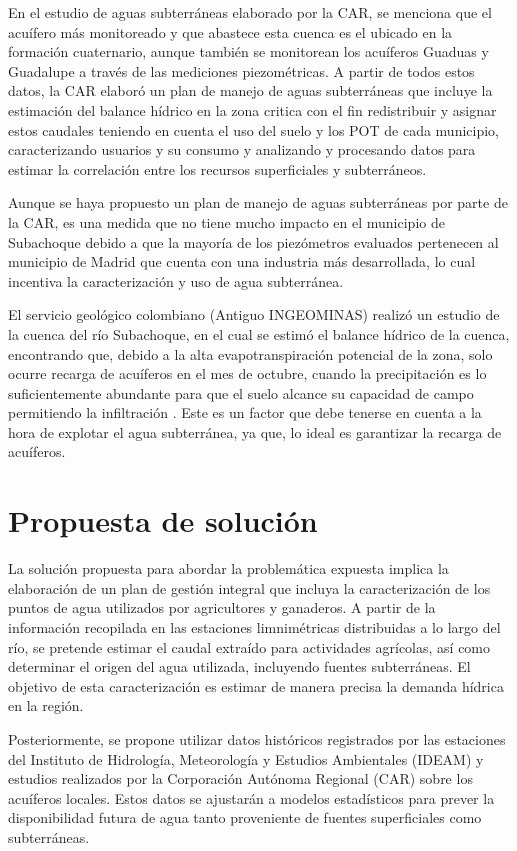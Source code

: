 \documentclass[draft]{agujournal2019}
\begin{document}
En el estudio de aguas subterráneas elaborado por la CAR, se menciona que el acuífero más monitoreado y que abastece esta cuenca es el ubicado en la formación cuaternario, aunque también se monitorean los acuíferos Guaduas y Guadalupe a través de las mediciones piezométricas. A partir de todos estos datos, la CAR elaboró un plan de manejo de aguas subterráneas que incluye la estimación del balance hídrico en la zona critica con el fin redistribuir y asignar estos caudales teniendo en cuenta el uso del suelo y los POT de cada municipio, caracterizando usuarios y su consumo y analizando y procesando datos para estimar la correlación entre los recursos superficiales y subterráneos.

Aunque se haya propuesto un plan de manejo de aguas subterráneas por parte de la CAR, es una medida que no tiene mucho impacto en el municipio de Subachoque debido a que la mayoría de los piezómetros evaluados pertenecen al municipio de Madrid que cuenta con una industria más desarrollada, lo cual incentiva la caracterización y uso de agua subterránea.

El servicio geológico colombiano (Antiguo INGEOMINAS) realizó un estudio de la cuenca del río Subachoque, en el cual se estimó el balance hídrico de la cuenca, encontrando que, debido a la alta evapotranspiración potencial de la zona, solo ocurre recarga de acuíferos en el mes de octubre, cuando la precipitación es lo suficientemente abundante para que el suelo alcance su capacidad de campo permitiendo la infiltración \cite{INGEOMINAS}. Este es un factor que debe tenerse en cuenta a la hora de explotar el agua subterránea, ya que, lo ideal es garantizar la recarga de acuíferos.

\section{Propuesta de solución}
La solución propuesta para abordar la problemática expuesta implica la elaboración de un plan de gestión integral que incluya la caracterización de los puntos de agua utilizados por agricultores y ganaderos. A partir de la información recopilada en las estaciones limnimétricas distribuidas a lo largo del río, se pretende estimar el caudal extraído para actividades agrícolas, así como determinar el origen del agua utilizada, incluyendo fuentes subterráneas. El objetivo de esta caracterización es estimar de manera precisa la demanda hídrica en la región.

Posteriormente, se propone utilizar datos históricos registrados por las estaciones del Instituto de Hidrología, Meteorología y Estudios Ambientales (IDEAM) y estudios realizados por la Corporación Autónoma Regional (CAR) sobre los acuíferos locales. Estos datos se ajustarán a modelos estadísticos para prever la disponibilidad futura de agua tanto proveniente de fuentes superficiales como subterráneas.
\end{document}
